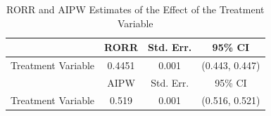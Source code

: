 \documentclass{article}
\begin{document}
\begin{table}[ht]
\centering
\caption{RORR and AIPW Estimates of the Effect of the Treatment Variable}
\begin{tabular}{lccc}
\toprule
 & RORR & Std. Err. & 95\% CI \\
\midrule
Treatment Variable & 0.4451 & 0.001 & (0.443, 0.447) \\
\midrule
 & AIPW & Std. Err. & 95\% CI \\
\midrule
Treatment Variable & 0.519 & 0.001 & (0.516, 0.521) \\
\bottomrule
\end{tabular}
\end{table}
\end{document}
